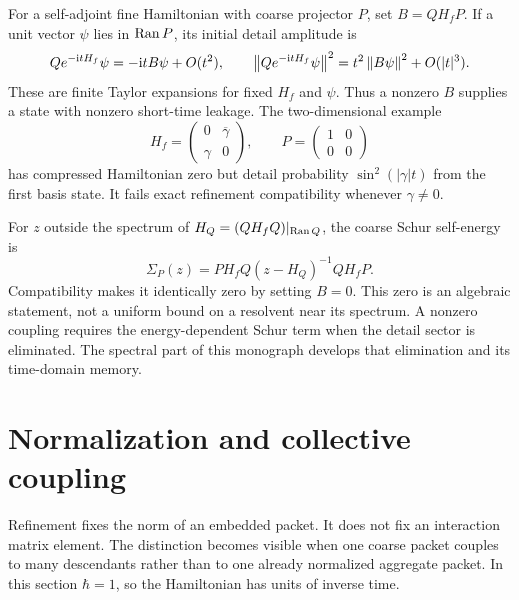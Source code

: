 For a self-adjoint fine Hamiltonian with coarse projector $P$, set
$B=QH_fP$. If a unit vector $\psi$ lies in $\operatorname{Ran} P$, its initial
detail amplitude is
\[
 Qe^{-\mathrm{i}tH_f}\psi=-\mathrm{i}tB\psi+O(t^2),
 \qquad
 \left\lVert Qe^{-\mathrm{i}tH_f}\psi\right\rVert^2
 =t^2\left\lVert B\psi\right\rVert^2+O(|t|^3).
\]
These are finite Taylor expansions for fixed $H_f$ and $\psi$.
Thus a nonzero $B$ supplies a state with nonzero short-time leakage.
The two-dimensional example
\[
 H_f=\begin{pmatrix}0&\overline\gamma\\\gamma&0\end{pmatrix},
 \qquad P=\begin{pmatrix}1&0\\0&0\end{pmatrix}
\]
has compressed Hamiltonian zero but detail probability
$\sin^2(|\gamma|t)$ from the first basis state. It fails exact
refinement compatibility whenever $\gamma\neq0$.

For $z$ outside the spectrum of $H_Q=(QH_fQ)|_{\operatorname{Ran} Q}$, the
coarse Schur self-energy is
\begin{equation}
 \Sigma_P(z)=PH_fQ(z-H_Q)^{-1}QH_fP.
 \label{a-finite-self-energy}
\end{equation}
Compatibility makes it identically zero by setting $B=0$. This zero
is an algebraic statement, not a uniform bound on a resolvent near
its spectrum. A nonzero coupling requires the energy-dependent Schur
term when the detail sector is eliminated. The spectral part of this
monograph develops that elimination and its time-domain memory.


\section{Normalization and collective coupling}
\label{a-finite-normalization}

Refinement fixes the norm of an embedded packet. It does not fix an
interaction matrix element. The distinction becomes visible when one
coarse packet couples to many descendants rather than to one already
normalized aggregate packet. In this section $\hbar=1$, so the
Hamiltonian has units of inverse time.

